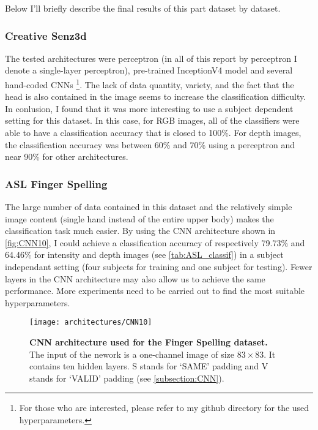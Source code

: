 Below I'll briefly describe the final results of this part dataset by
dataset.

\subsubsection{Creative Senz3d}

The tested architectures were perceptron (in all of this report by
perceptron I denote a single-layer perceptron), pre-trained InceptionV4
model \cite{C. Szegedy 2017} and several hand-coded CNNs%
\footnote{For those who are interested, please refer to my github
directory for the used hyperparameters.}.
The lack of data quantity, variety, and the fact that the head is also
contained in the image seems to increase the classification difficulty.
In conlusion, I found that it was more interesting to use a subject
dependent setting for this dataset. In this case, for RGB images,
all of the classifiers were able to have a classification accuracy that is
closed to 100\%. For depth images, the classification accuracy was
between 60\% and 70\% using a perceptron and near 90\% for other
architectures.

\subsubsection{ASL Finger Spelling} \label{subsubsection:ASL_CNN}

The large number of data contained in this dataset and the relatively
simple image content (single hand instead of the entire upper body)
makes the classification task much easier. By using the CNN architecture
shown in \autoref{fig:CNN10}, I could achieve a classification accuracy
of respectively 79.73\% and 64.46\% for intensity and depth images
(see \autoref{tab:ASL_classif})
in a subject independant setting (four subjects for training and one
subject for testing). Fewer layers in the CNN architecture may also allow
us to achieve the same performance. More experiments need to be carried
out to find the most suitable hyperparameters.

\vspace{-1em}
\begin{figure}[H]
  \centering
  \texttt{[image: architectures/CNN10]}
  \caption{%
    \textbf{CNN architecture used for the Finger Spelling  dataset.}
      \\[0.1em]
    The input of the nework is a one-channel image of size $83 \times 83$.
      It contains ten hidden layers. S stands for `SAME' padding
      and V stands for `VALID' padding (see \ref{subsection:CNN}).}
  \label{fig:CNN10}
\end{figure}

